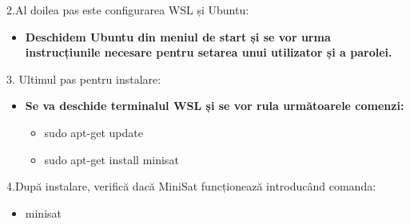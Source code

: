 \documentclass[12pt,a4paper]{report}
\begin{document}
2.Al doilea pas este configurarea WSL și Ubuntu:
 \begin{itemize}
 \item \textbf{Deschidem Ubuntu din meniul de start și se vor urma instrucțiunile necesare pentru setarea unui utilizator și a parolei.} 

\end{itemize}

3. Ultimul pas pentru instalare:

\begin{itemize}
 \item \textbf{Se va deschide terminalul WSL și se vor rula următoarele comenzi:}
\begin{itemize}
 \item {sudo apt-get update}
\item {sudo apt-get install minisat}

\end{itemize}
\end{itemize}

4.După instalare, verifică dacă MiniSat funcționează introducând comanda:
\begin{itemize}
\begin{itemize}
 \item {minisat}
\end{itemize}
\end{itemize}
\end{document}
